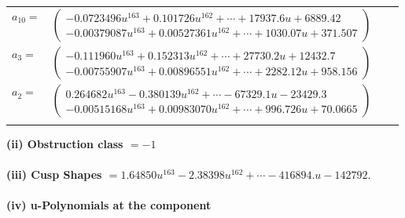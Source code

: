 \documentclass[1p]{elsarticle_modified}
\theoremstyle{definition}
\begin{document}
\begin{tabular}{m{7pt} m{180pt} m{7pt} m{180pt} }
\flushright $a_{10}=$&$\begin{pmatrix}-0.0723496 u^{163}+0.101726 u^{162}+\cdots+17937.6 u+6889.42\\-0.00379087 u^{163}+0.00527361 u^{162}+\cdots+1030.07 u+371.507\end{pmatrix}$ \\
\flushright $a_{3}=$&$\begin{pmatrix}-0.111960 u^{163}+0.152313 u^{162}+\cdots+27730.2 u+12432.7\\-0.00755907 u^{163}+0.00896551 u^{162}+\cdots+2282.12 u+958.156\end{pmatrix}$ \\
\flushright $a_{2}=$&$\begin{pmatrix}0.264682 u^{163}-0.380139 u^{162}+\cdots-67329.1 u-23429.3\\-0.00515168 u^{163}+0.00983070 u^{162}+\cdots+996.726 u+70.0665\end{pmatrix}$\\&\end{tabular}
\flushleft \textbf{(ii) Obstruction class $= -1$}\\~\\
\flushleft \textbf{(iii) Cusp Shapes $= 1.64850 u^{163}-2.38398 u^{162}+\cdots-416894. u-142792.$}\\~\\
\newpage\renewcommand{\arraystretch}{1}
\flushleft \textbf{(iv) u-Polynomials at the component}\newline \\
\end{document}
